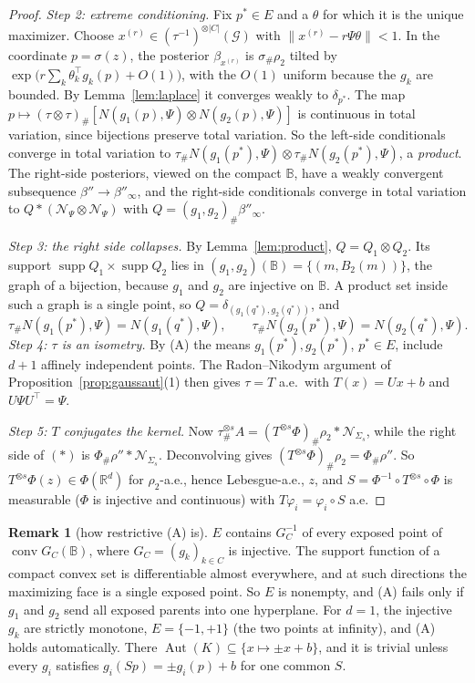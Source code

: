 \documentclass[11pt]{article}
\theoremstyle{definition}
\newtheorem{remark}[theorem]{Remark}
\newcommand{\norm}[1]{\lVert #1\rVert}
\newcommand{\R}{\mathbb R}
\begin{document}
\begin{proof}
\emph{Step 2: extreme conditioning.} Fix $p^*\in E$ and a $\theta$ for which it is the unique maximizer. Choose
$x^{(r)}\in(\tau^{-1})^{\otimes|C|}(\mathcal G)$ with $\norm{x^{(r)}-r\Psi\theta}<1$. In the coordinate
$p=\sigma(z)$, the posterior $\beta_{x^{(r)}}$ is $\sigma_\#\rho_2$ tilted by
$\exp\big(r\sum_k\theta_k^{\!\top}g_k(p)+O(1)\big)$, with the $O(1)$ uniform because the $g_k$ are bounded. By
Lemma~\ref{lem:laplace} it converges weakly to $\delta_{p^*}$. The map
$p\mapsto(\tau\otimes\tau)_\#[N(g_1(p),\Psi)\otimes N(g_2(p),\Psi)]$ is continuous in total variation, since
bijections preserve total variation. So the left-side conditionals converge in total variation to
$\tau_\#N(g_1(p^*),\Psi)\otimes\tau_\#N(g_2(p^*),\Psi)$, a \emph{product}. The right-side posteriors,
viewed on the compact $\mathbb B$, have a weakly convergent subsequence $\beta''\to\beta''_\infty$, and
the right-side conditionals converge in total variation to $Q*(\mathcal N_\Psi\otimes\mathcal N_\Psi)$ with
$Q=(g_1,g_2)_\#\beta''_\infty$.

\emph{Step 3: the right side collapses.} By Lemma~\ref{lem:product}, $Q=Q_1\otimes Q_2$. Its support
$\operatorname{supp}Q_1\times\operatorname{supp}Q_2$ lies in $(g_1,g_2)(\mathbb B)=\{(m,B_2(m))\}$, the
graph of a bijection, because $g_1$ and $g_2$ are injective on $\mathbb B$. A product set inside such a graph
is a single point, so $Q=\delta_{(g_1(q^*),g_2(q^*))}$, and
\[
\tau_\#N(g_1(p^*),\Psi)=N(g_1(q^*),\Psi),\qquad\tau_\#N(g_2(p^*),\Psi)=N(g_2(q^*),\Psi).
\]
\emph{Step 4: $\tau$ is an isometry.} By (A) the means $g_1(p^*),g_2(p^*)$, $p^*\in E$, include $d+1$
affinely independent points. The Radon--Nikodym argument of Proposition~\ref{prop:gaussaut}(1) then
gives $\tau=T$ a.e.\ with $T(x)=Ux+b$ and $U\Psi U^{\!\top}=\Psi$.

\emph{Step 5: $T$ conjugates the kernel.} Now
$\tau^{\otimes s}_{\#}A=(T^{\otimes s}\Phi)_\#\rho_2*\mathcal N_{\Sigma_s}$, while the right side of $(\ast)$ is
$\Phi_\#\rho''*\mathcal N_{\Sigma_s}$. Deconvolving gives $(T^{\otimes s}\Phi)_\#\rho_2=\Phi_\#\rho''$. So
$T^{\otimes s}\Phi(z)\in\Phi(\R^d)$ for $\rho_2$-a.e., hence Lebesgue-a.e., $z$, and
$S=\Phi^{-1}\circ T^{\otimes s}\circ\Phi$ is measurable ($\Phi$ is injective and continuous) with
$T\varphi_i=\varphi_i\circ S$ a.e.
\end{proof}

\begin{remark}[how restrictive (A) is]
$E$ contains $G_C^{-1}$ of every exposed point of $\operatorname{conv}G_C(\mathbb B)$, where
$G_C=(g_k)_{k\in C}$ is injective. The support function of a compact convex set is differentiable almost
everywhere, and at such directions the maximizing face is a single exposed point. So $E$ is nonempty,
and (A) fails only if $g_1$ and $g_2$ send all exposed parents into one hyperplane. For $d=1$, the
injective $g_k$ are strictly monotone, $E=\{-1,+1\}$ (the two points at infinity), and (A) holds
automatically. There $\operatorname{Aut}(K)\subseteq\{x\mapsto\pm x+b\}$, and it is trivial unless every
$g_i$ satisfies $g_i(Sp)=\pm g_i(p)+b$ for one common $S$.
\end{remark}
\end{document}
